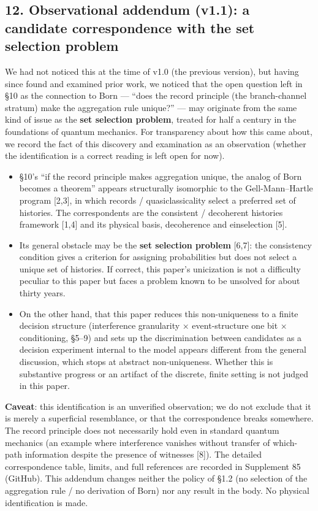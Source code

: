 \documentclass[
]{ltjsarticle}
\providecommand{\tightlist}{%
  \setlength{\itemsep}{0pt}\setlength{\parskip}{0pt}}
\begin{document}
\subsection{12. Observational addendum (v1.1): a candidate
correspondence with the set selection
problem}\label{observational-addendum-v1.1-a-candidate-correspondence-with-the-set-selection-problem}

We had not noticed this at the time of v1.0 (the previous version), but
having since found and examined prior work, we noticed that the open
question left in §10 as the connection to Born --- ``does the record
principle (the branch-channel stratum) make the aggregation rule
unique?'' --- may originate from the same kind of issue as the
\textbf{set selection problem}, treated for half a century in the
foundations of quantum mechanics. For transparency about how this came
about, we record the fact of this discovery and examination as an
observation (whether the identification is a correct reading is left
open for now).

\begin{itemize}
\tightlist
\item
  §10's ``if the record principle makes aggregation unique, the analog
  of Born becomes a theorem'' appears structurally isomorphic to the
  Gell-Mann--Hartle program {[}2,3{]}, in which records /
  quasiclassicality select a preferred set of histories. The
  correspondents are the consistent / decoherent histories framework
  {[}1,4{]} and its physical basis, decoherence and einselection
  {[}5{]}.
\item
  Its general obstacle may be the \textbf{set selection problem}
  {[}6,7{]}: the consistency condition gives a criterion for assigning
  probabilities but does not select a unique set of histories. If
  correct, this paper's unicization is not a difficulty peculiar to this
  paper but faces a problem known to be unsolved for about thirty years.
\item
  On the other hand, that this paper reduces this non-uniqueness to a
  finite decision structure (interference granularity × event-structure
  one bit × conditioning, §5--9) and sets up the discrimination between
  candidates as a decision experiment internal to the model appears
  different from the general discussion, which stops at abstract
  non-uniqueness. Whether this is substantive progress or an artifact of
  the discrete, finite setting is not judged in this paper.
\end{itemize}

\textbf{Caveat}: this identification is an unverified observation; we do
not exclude that it is merely a superficial resemblance, or that the
correspondence breaks somewhere. The record principle does not
necessarily hold even in standard quantum mechanics (an example where
interference vanishes without transfer of which-path information despite
the presence of witnesses {[}8{]}). The detailed correspondence table,
limits, and full references are recorded in Supplement 85 (GitHub). This
addendum changes neither the policy of §1.2 (no selection of the
aggregation rule / no derivation of Born) nor any result in the body. No
physical identification is made.
\end{document}
